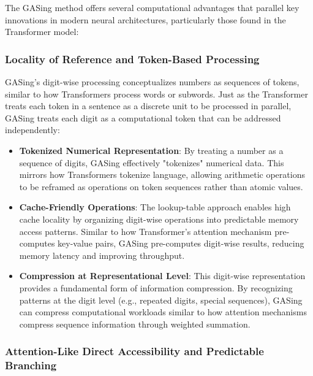 The GASing method offers several computational advantages that parallel key innovations in modern neural architectures, particularly those found in the Transformer model:
\subsubsection{Locality of Reference and Token-Based Processing}

GASing's digit-wise processing conceptualizes numbers as sequences of tokens, similar to how Transformers process words or subwords. Just as the Transformer treats each token in a sentence as a discrete unit to be processed in parallel, GASing treats each digit as a computational token that can be addressed independently:

\begin{itemize}
\item \textbf{Tokenized Numerical Representation}: By treating a number as a sequence of digits, GASing effectively "tokenizes" numerical data. This mirrors how Transformers tokenize language, allowing arithmetic operations to be reframed as operations on token sequences rather than atomic values.
\end{itemize}

\begin{itemize}
\item \textbf{Cache-Friendly Operations}: The lookup-table approach enables high cache locality by organizing digit-wise operations into predictable memory access patterns. Similar to how Transformer's attention mechanism pre-computes key-value pairs, GASing pre-computes digit-wise results, reducing memory latency and improving throughput.
\end{itemize}

\begin{itemize}
\item \textbf{Compression at Representational Level}: This digit-wise representation provides a fundamental form of information compression. By recognizing patterns at the digit level (e.g., repeated digits, special sequences), GASing can compress computational workloads similar to how attention mechanisms compress sequence information through weighted summation.
\end{itemize}
\subsubsection{Attention-Like Direct Accessibility and Predictable Branching}

